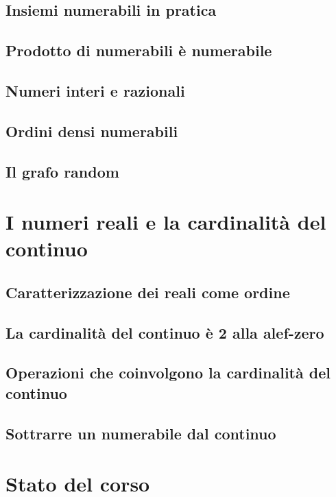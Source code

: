 \documentclass[11pt]{scrartcl}
\begin{document}
\subsection{Insiemi numerabili in pratica}
\newpage
\subsection{Prodotto di numerabili è numerabile}
\newpage
\subsection{Numeri interi e razionali}
\newpage
\subsection{Ordini densi numerabili}
\newpage
\subsection{Il grafo random}




\newpage
\section{I numeri reali e la cardinalità del continuo}
\subsection{Caratterizzazione dei reali come ordine}
\newpage
\subsection{La cardinalità del continuo è 2 alla alef-zero}
\newpage
\subsection{Operazioni che coinvolgono la cardinalità del continuo}
\newpage
\subsection{Sottrarre un numerabile dal continuo}




\newpage
\section{Stato del corso}
\end{document}
